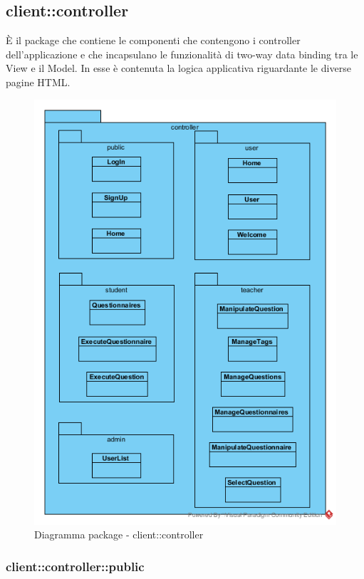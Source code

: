 \subsection{client::controller}
È il package che contiene le componenti che contengono i
controller dell’applicazione e che incapsulano le funzionalità di two-way data binding tra le View e il Model. In esse è contenuta la logica applicativa riguardante le diverse pagine HTML.\begin{center}
	\begin{figure}[H]
		\centering \includegraphics[scale=4, max width=\textwidth, max height=\myheight]{../img/diagrammiClassi/client/controller.png}
		\caption{Diagramma package - client::controller}
	\end{figure}
\end{center}\subsubsection{client::controller::public}
